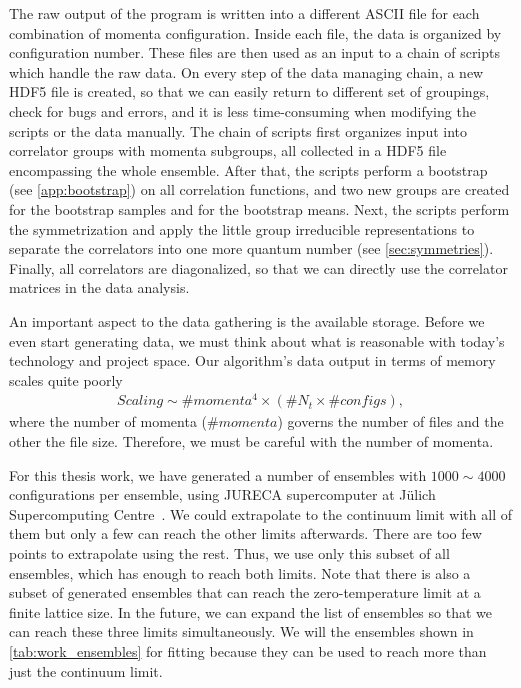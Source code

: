 The raw output of the program is written into a different ASCII file for each combination of momenta configuration. Inside each file, the data is organized by configuration number. These files are then used as an input to a chain of scripts which handle the raw data. On every step of the data managing chain, a new HDF5 file is created, so that we can easily return to different set of groupings, check for bugs and errors, and it is less time-consuming when modifying the scripts or the data manually. The chain of scripts first organizes input into correlator groups with momenta subgroups, all collected in a HDF5 file encompassing the whole ensemble. After that, the scripts perform a bootstrap (see \cref{app:bootstrap}) on all correlation functions, and two new groups are created for the bootstrap samples and for the bootstrap means. Next, the scripts perform the symmetrization and apply the little group irreducible representations to separate the correlators into one more quantum number (see \cref{sec:symmetries}). Finally, all correlators are diagonalized, so that we can directly use the correlator matrices in the data analysis.

An important aspect to the data gathering is the available storage. Before we even start generating data, we must think about what is reasonable with today's technology and project space. Our algorithm's data output in terms of memory scales quite poorly
\begin{equation}
    \begin{aligned}
        Scaling \sim \#momenta^{4} \times \left( \#N_t \times \#configs \right),
    \end{aligned}
\end{equation}
where the number of momenta ($\#momenta$) governs the number of files and the other the file size. Therefore, we must be careful with the number of momenta.

For this thesis work, we have generated a number of ensembles with $1000 \sim  4000$ configurations per ensemble, using JURECA supercomputer at Jülich Supercomputing Centre~\cite{jureca}. We could extrapolate to the continuum limit with all of them but only a few can reach the other limits afterwards. There are too few points to extrapolate using the rest. Thus, we use only this subset of all ensembles, which has enough to reach both limits. Note that there is also a subset of generated ensembles that can reach the zero-temperature limit at a finite lattice size. In the future, we can expand the list of ensembles so that we can reach these three limits simultaneously. We will the ensembles shown in \cref{tab:work_ensembles} for fitting because they can be used to reach more than just the continuum limit.

